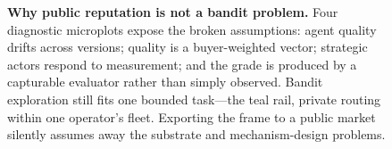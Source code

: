 \begin{figure}[H]
{}
\caption{\textbf{Why public reputation is not a bandit problem.} Four diagnostic
microplots expose the broken assumptions: agent quality drifts across versions;
quality is a buyer-weighted vector; strategic actors respond to measurement; and
the grade is produced by a capturable evaluator rather than simply observed.
Bandit exploration still fits one bounded task—the teal rail, private routing
within one operator's fleet. Exporting the frame to a public market silently
assumes away the substrate and mechanism-design problems.}
\label{fig:not-bandit}
\end{figure}
